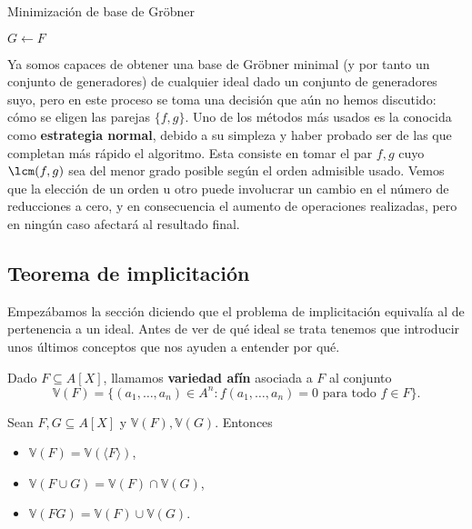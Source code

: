 \begin{algorithm}[hbt!]
    \caption{Minimización de base de Gröbner}\label{a:minim}

    $G\gets F$\;

\end{algorithm}

Ya somos capaces de obtener una base de Gröbner minimal (y por tanto un conjunto de generadores) de cualquier ideal dado un conjunto de generadores suyo, pero en este proceso se toma una decisión que aún no hemos discutido: cómo se eligen las parejas $\{f,g\}$. Uno de los métodos más usados es la conocida como \textbf{estrategia normal}, debido a su simpleza y haber probado ser de las que completan más rápido el algoritmo. Esta consiste en tomar el par $f,g$ cuyo $\lcm(f,g)$ sea del menor grado posible según el orden admisible usado. Vemos que la elección de un orden u otro puede involucrar un cambio en el número de reducciones a cero, y en consecuencia el aumento de operaciones realizadas, pero en ningún caso afectará al resultado final.

\subsection{Teorema de implicitación}
Empezábamos la sección diciendo que el problema de implicitación equivalía al de pertenencia a un ideal. Antes de ver de qué ideal se trata tenemos que introducir unos últimos conceptos que nos ayuden a entender por qué.

\begin{definicion}Dado $F \subseteq A[X]$, llamamos \textbf{variedad afín} asociada a $F$ al conjunto
    \begin{equation*}
        \mathbb{V}(F) = \{(a_1,\dots, a_n)\in A^n : f(a_1,\dots, a_n)=0 \text{ para todo } f\in F \}.
    \end{equation*}
\end{definicion}

\begin{proposicion}
    Sean $F,G\subseteq A[X]$ y $\mathbb{V}(F), \mathbb{V}(G)$. Entonces
    \begin{itemize}
        \item  $\mathbb{V}(F) =  \mathbb{V}(\langle F\rangle)$,
        \item $\mathbb{V}(F\cup G) = \mathbb{V}(F) \cap \mathbb{V}(G)$,
        \item $\mathbb{V}(FG) = \mathbb{V}(F) \cup \mathbb{V}(G)$.
    \end{itemize}
\end{proposicion}

